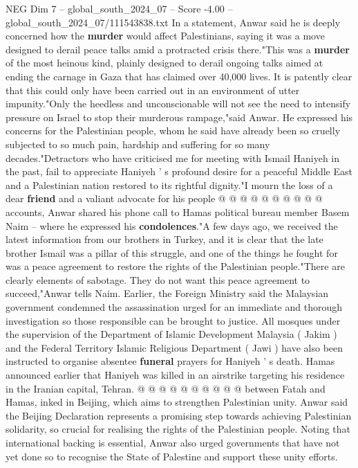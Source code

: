 \begin{textsample}{NEG Dim 7 – global\_south\_2024\_07 – Score -4.00 – global\_south\_2024\_07/111543838.txt}  \label{ex:f7_neg_340}
In a statement, Anwar said he is deeply concerned how the \textbf{murder} would affect Palestinians, saying it was a move designed to derail peace talks amid a protracted crisis there."This was a \textbf{murder} of the most heinous kind, plainly designed to derail ongoing talks aimed at ending the carnage in Gaza that has claimed over 40,000 lives.
It is patently clear that this could only have been carried out in an environment of utter impunity."Only the heedless and unconscionable will not see the need to intensify pressure on Israel to stop their murderous rampage,"said Anwar.
He expressed his concerns for the Palestinian people, whom he said have already been so cruelly subjected to so much pain, hardship and suffering for so many decades."Detractors who have criticised me for meeting with Ismail Haniyeh in the past, fail to appreciate Haniyeh ' s profound desire for a peaceful Middle East and a Palestinian nation restored to its rightful dignity."I mourn the loss of a dear \textbf{friend} and a valiant advocate for his people @ @ @ @ @ @ @ @ @ @ accounts, Anwar shared his phone call to Hamas political bureau member Basem Naim -- where he expressed his \textbf{condolences}."A few days ago, we received the latest information from our brothers in Turkey, and it is clear that the late brother Ismail was a pillar of this struggle, and one of the things he fought for was a peace agreement to restore the rights of the Palestinian people."There are clearly elements of sabotage.
They do not want this peace agreement to succeed,"Anwar tells Naim.
Earlier, the Foreign Ministry said the Malaysian government condemned the assassination urged for an immediate and thorough investigation so those responsible can be brought to justice.
All mosques under the supervision of the Department of Islamic Development Malaysia ( Jakim ) and the Federal Territory Islamic Religious Department ( Jawi ) have also been instructed to organise absentee \textbf{funeral} prayers for Haniyeh ' s death.
Hamas announced earlier that Haniyeh was killed in an airstrike targeting his residence in the Iranian capital, Tehran. @ @ @ @ @ @ @ @ @ @ between Fatah and Hamas, inked in Beijing, which aims to strengthen Palestinian unity.
Anwar said the Beijing Declaration represents a promising step towards achieving Palestinian solidarity, so crucial for realising the rights of the Palestinian people.
Noting that international backing is essential, Anwar also urged governments that have not yet done so to recognise the State of Palestine and support these unity efforts.

\end{textsample}
